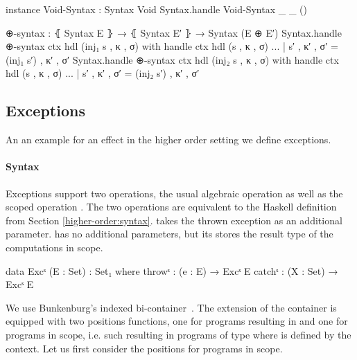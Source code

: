 \begin{code}
instance
  Void-Syntax : Syntax Void
  Syntax.handle Void-Syntax _ _ ()

  ⊕-syntax : ⦃ Syntax E ⦄ → ⦃ Syntax E′ ⦄ → Syntax (E ⊕ E′)
  Syntax.handle ⊕-syntax ctx hdl (inj₁ s , κ , σ) with handle ctx hdl (s , κ , σ)
  ... | s′ , κ′ , σ′ = (inj₁ s′) , κ′ , σ′
  Syntax.handle ⊕-syntax ctx hdl (inj₂ s , κ , σ) with handle ctx hdl (s , κ , σ)
  ... | s′ , κ′ , σ′ = (inj₂ s′) , κ′ , σ′
\end{code}


\subsection{Exceptions}
\label{higher-order:exceptions}

An an example for an effect in the higher order setting we define exceptions.

\paragraph{Syntax}
Exceptions support two operations, the usual algebraic operation
 as well as the scoped operation .
The two operations are equivalent to the Haskell definition from Section
\ref{higher-order:syntax}.
 takes the thrown exception as an additional parameter.
 has no additional parameters, but its 
stores the result type of the computations in scope.

\begin{code}
data Excˢ (E : Set) : Set₁ where
  throwˢ  : (e : E)    → Excˢ E
  catchˢ  : (X : Set)  → Excˢ E
\end{code}
We use Bunkenburg's indexed bi-container~\cite{bunkenburg2019modeling}.
The extension of the container is equipped with two positions functions, one for
programs resulting in
\AgdaSpace{}\AgdaSpace{}
and one for programs in scope, i.e. such resulting in programs of type
\AgdaSpace{}\AgdaSpace{}
where  is defined by the context.
Let us first consider the positions for programs in scope.

